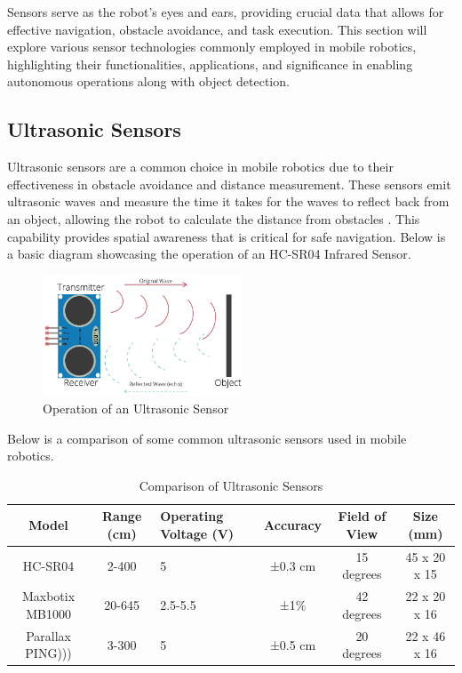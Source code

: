 Sensors serve as the robot's eyes and ears, providing crucial data that allows for effective navigation, obstacle avoidance, and task execution. This section will explore various sensor technologies commonly employed in mobile robotics, highlighting their functionalities, applications, and significance in enabling autonomous operations along with object detection.

\subsection{Ultrasonic Sensors} 
Ultrasonic sensors are a common choice in mobile robotics due to their effectiveness in obstacle avoidance and distance measurement. These sensors emit ultrasonic waves and measure the time it takes for the waves to reflect back from an object, allowing the robot to calculate the distance from obstacles \cite{maupin2023ultrasonic}. This capability provides spatial awareness that is critical for safe navigation. Below is a basic diagram showcasing the operation of an HC-SR04 Infrared Sensor.

\begin{figure}[ht]
    \centering
    \includegraphics[width=0.53\textwidth]{ch2/figs/ultrasonic_sensor.png} %
    \caption{Operation of an Ultrasonic Sensor {\cite{randomnerd2021ultrasonic}}}
    \label{fig:ultrasonic_sensor}
\end{figure}

\noindent
Below is a comparison of some common ultrasonic sensors used in mobile robotics.

\begin{table}[ht]
\centering
\caption{Comparison of Ultrasonic Sensors}
\begin{tabularx}{\textwidth}{|c|c|X|c|c|c|}
\hline
\textbf{Model} & \textbf{Range (cm)} & \textbf{Operating Voltage (V)} & \textbf{Accuracy} & \textbf{Field of View} & \textbf{Size (mm)} \\ \hline
HC-SR04 & 2-400 & 5 & ±0.3 cm & 15 degrees & 45 x 20 x 15 \\ \hline
Maxbotix MB1000 & 20-645 & 2.5-5.5 & ±1\% & 42 degrees & 22 x 20 x 16 \\ \hline
Parallax PING))) & 3-300 & 5 & ±0.5 cm & 20 degrees & 22 x 46 x 16 \\ \hline
\end{tabularx}
\label{tab:ultrasonic_comparison}
\end{table}

